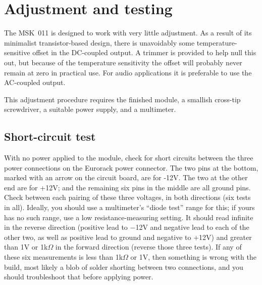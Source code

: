 
%
%
%
%
%
%
\chapter{Adjustment and testing}

The MSK~011 is designed to work with very little adjustment.  As a result of
its minimalist transistor-based design, there is unavoidably some
temperature-sensitive offset in the DC-coupled output.  A trimmer is
provided to help null this out, but because of the temperature sensitivity
the offset will probably never remain at zero in practical use.  For audio
applications it is preferable to use the AC-coupled output.

This adjustment procedure requires the finished module, a smallish cross-tip
screwdriver, a suitable power supply, and a multimeter.

\section{Short-circuit test}

With no power applied to the module, check for short circuits between the
three power connections on the Eurorack power connector.  The two
pins at the bottom, marked with an arrow on the circuit board, are for -12V. 
The two at the other end are for +12V; and the remaining six pins in the
middle are all ground pins.  Check between each pairing of these three
voltages, in both directions (six tests in all).  Ideally, you should use a
multimeter's ``diode test'' range for this; if yours has no such range, use
a low resistance-measuring setting. It should read infinite in the reverse
direction (positive lead to $-$12V and negative lead to each of the other
two, as well as positive lead to ground and negative to $+$12V) and greater
than 1V or 1k$\Omega$ in the forward direction (reverse those three
tests).  If any of these six measurements is less than 1k$\Omega$ or 1V,
then something is wrong with the build, most likely a blob of solder
shorting between two connections, and you should troubleshoot that before
applying power.

